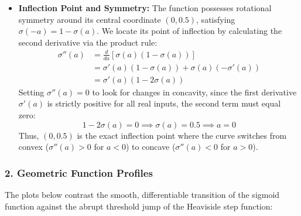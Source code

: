 \documentclass{article}
\begin{document}
\begin{itemize}
    \item \textbf{Inflection Point and Symmetry:} The function possesses rotational symmetry around its central coordinate $(0, 0.5)$, satisfying $\sigma(-a) = 1 - \sigma(a)$. We locate its point of inflection by calculating the second derivative via the product rule:
    \begin{align}
        \sigma''(a) &= \frac{d}{da} \left[ \sigma(a)(1 - \sigma(a)) \right] \\
        &= \sigma'(a)(1 - \sigma(a)) + \sigma(a)(-\sigma'(a)) \\
        &= \sigma'(a)\left(1 - 2\sigma(a)\right)
    \end{align}
    Setting $\sigma''(a) = 0$ to look for changes in concavity, since the first derivative $\sigma'(a)$ is strictly positive for all real inputs, the second term must equal zero:
    \begin{equation}
        1 - 2\sigma(a) = 0 \implies \sigma(a) = 0.5 \implies a = 0
    \end{equation}
    Thus, $(0, 0.5)$ is the exact inflection point where the curve switches from convex ($\sigma''(a) > 0$ for $a < 0$) to concave ($\sigma''(a) < 0$ for $a > 0$).
\end{itemize}

\subsubsection*{2. Geometric Function Profiles}
The plots below contrast the smooth, differentiable transition of the sigmoid function against the abrupt threshold jump of the Heaviside step function:

\begin{center}
\hfill
{}
\end{center}
\end{document}
